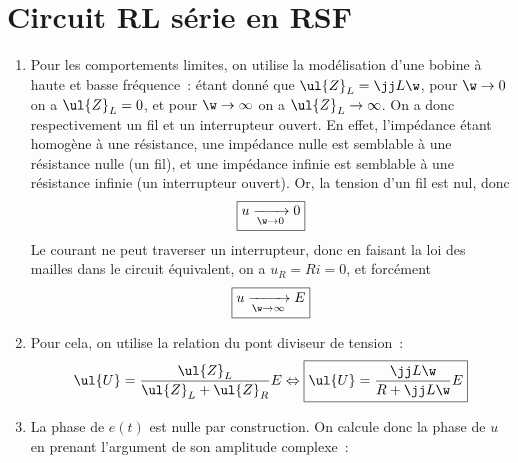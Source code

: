 \documentclass[a4paper, 12pt, final, garamond]{book}
\begin{document}
\section{Circuit RL série en RSF}
\begin{enumerate}
    \item Pour les comportements limites, on utilise la modélisation d'une
        bobine à haute et basse fréquence~: étant donné que $\ul{Z}_L = \jj L
        \w$, pour $\w\rightarrow0$ on a $\ul{Z}_L = 0$, et pour
        $\w\rightarrow\infty$ on a $\ul{Z}_L \rightarrow \infty$. On a donc
        respectivement un fil et un interrupteur ouvert. En effet, l'impédance
        étant homogène à une résistance, une impédance nulle est semblable à une
        résistance nulle (un fil), et une impédance infinie est semblable à une
        résistance infinie (un interrupteur ouvert). \bigbreak
        Or, la tension d'un fil est nul, donc
        \[\boxed{u \xrightarrow[\w\rightarrow0]{} 0}\]
        Le courant ne peut traverser un interrupteur, donc en faisant la loi des
        mailles dans le circuit équivalent, on a $u_R = Ri = 0$, et forcément
        \[\boxed{u \xrightarrow[\w\rightarrow\infty]{} E}\]
    \item Pour cela, on utilise la relation du pont diviseur de tension~:
        \begin{gather*}
            \ul{U}
                = \frac{\ul{Z}_L}{\ul{Z}_L + \ul{Z}_R}E
            \Leftrightarrow
            \boxed{\ul{U}
            = \frac{\jj L\w}{R + \jj L \w}E}
        \end{gather*}

    \item La phase de $e(t)$ est nulle par construction. On calcule donc la
        phase de $u$ en prenant l'argument de son amplitude complexe~:


\end{enumerate}
\end{document}
